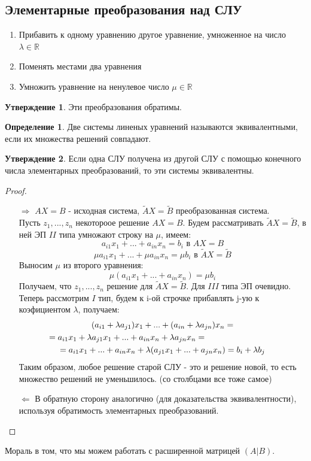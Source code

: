 \documentclass[a4paper, 12pt]{article}
\newcommand{\R}{\mathbb R}
\newcommand\tab[1][.5cm]{\hspace*{#1}}
\theoremstyle{definition}
\newtheorem*{definition}{Определение}
\newtheorem*{subtheorem}{Утверждение}
\begin{document}
    \subsection{Элементарные преобразования над СЛУ}
    \begin{enumerate}
      \item Прибавить к одному уравнению другое уравнение, умноженное на число $\lambda \in \R$
      \item Поменять местами два уравнения
      \item Умножить уравнение на ненулевое число $\mu \in \R$
    \end{enumerate}
    \begin{subtheorem}
      Эти преобразования обратимы.
    \end{subtheorem}
    \begin{definition}
      Две системы линеных уравнений называются эквивалентными, если их множества решений совпадают.
    \end{definition}
    \begin{subtheorem}
      Если одна СЛУ получена из другой СЛУ с помощью конечного числа элементарных преобразований, то эти системы эквивалентны.
    \end{subtheorem}
    \begin{proof} \tab
      \begin{itemize}
        \item[\underline{$\Longrightarrow$}]
        $AX = B$ - исходная система, $\tilde{A} X = \tilde{B}$ преобразованная система. \\
        Пусть ${z_1,...,z_n}$ некотороое решение $AX = B$. Будем рассматривать $\tilde{A} X = \tilde{B}$, в ней ЭП $II$ типа умножают строку на $\mu$, имеем:
        $$a_{i1}x_1 +...+ a_{in}x_n = b_{i} \text{ в } AX = B$$
        $$\mu a_{i1}x_1 +...+\mu a_{in}x_n = \mu b_i \text{ в } \tilde{A} X = \tilde{B}$$ 
        Выносим $\mu$ из второго уравнения:
        $$\mu (a_{i1}x_1 +...+ a_{in}x_n) = \mu b_i$$
        Получаем, что ${z_1,...,z_n}$ решение для $\tilde{A} X = \tilde{B}$. Для $III$ типа ЭП очевидно. Теперь рассмотрим $I$ тип, будем к i-ой строчке прибавлять j-ую к коэфициентом $\lambda$, получаем:
        \begin{multline*}
        (a_{i1}+\lambda a_{j1})x_1 +...+(a_{in}+\lambda a_{jn})x_n = \\ = a_{i1}x_1+\lambda a_{j1}x_1 +...+a_{in}x_n+\lambda a_{jn}x_n = \tab[3cm] \\ = a_{i1}x_1 + ... + a_{in}x_n + \lambda (a_{j1}x_1 +...+ a_{jn}x_n) = b_i + \lambda b_j
        \end{multline*}
        Таким образом, любое решение старой СЛУ - это и решение новой, то есть множество
        решений не уменьшилось. (со столбцами все тоже самое)
        \item[\underline{$\Longleftarrow$}]
        В обратную сторону аналогично (для доказательства эквивалентности), используя обратимость элементарных преобразований.
      \end{itemize}
    \end{proof}
    Мораль в том, что мы можем работать с расширенной матрицей $(A|B)$.
\end{document}
